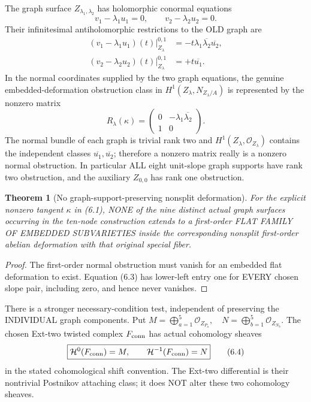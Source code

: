 \documentclass[11pt,a4paper]{article}
\newtheorem{theorem}{Theorem}[section]
\begin{document}
The graph surface
\(Z_{\lambda_1,\lambda_2}\)
has holomorphic conormal equations
\[
    v_1-\lambda_1u_1=0,\qquad
    v_2-\lambda_2u_2=0 .
\]
Their infinitesimal antiholomorphic
restrictions to the OLD graph are
\[
 \begin{aligned}
 (v_1-\lambda_1u_1)(t)|_{Z_\lambda}^{0,1}
     &=-t\lambda_1\overline{\lambda_2}
                    \overline{u_2},\\
 (v_2-\lambda_2u_2)(t)|_{Z_\lambda}^{0,1}
     &=+t\overline{u_1}.
 \end{aligned}                                            \tag{6.2}
\]
In the normal coordinates supplied by
the two graph equations, the genuine
embedded-deformation obstruction
class in
\(
 H^1(Z_\lambda,N_{Z_\lambda/A})
\)
is represented by the nonzero matrix
\[
 \boxed{
 R_\lambda(\kappa)=
 \begin{pmatrix}
       0&-\lambda_1\overline{\lambda_2}\\
       1&0
 \end{pmatrix}.
 }                                                       \tag{6.3}
\]
The normal bundle of each graph is
trivial rank two and
\(H^1(Z_\lambda,\mathcal O_{Z_\lambda})\)
contains the independent classes
\(\overline{u_1},\overline{u_2}\);
therefore a nonzero matrix really
is a nonzero normal obstruction.
In particular ALL eight unit-slope
graph supports have rank two
obstruction, and the auxiliary
\(Z_{0,0}\) has rank one obstruction.

\begin{theorem}[No graph-support-preserving nonsplit deformation]
For the explicit nonzero tangent
\(\kappa\) in (6.1), NONE of the nine
distinct actual graph surfaces
occurring in the ten-node
construction extends to a
first-order FLAT FAMILY OF
EMBEDDED SUBVARIETIES inside
the corresponding nonsplit
first-order abelian deformation
with that original special fiber.
\end{theorem}
\begin{proof}
The first-order normal obstruction
must vanish for an embedded
flat deformation to exist.
Equation (6.3) has lower-left
entry one for EVERY chosen
slope pair, including zero,
and hence never vanishes.
\end{proof}

There is a stronger necessary-condition
test, independent of preserving the
INDIVIDUAL graph components.
Put
\(
 M=\bigoplus_{a=1}^{5}\mathcal O_{Z_{P_a}},
\quad
 N=\bigoplus_{b=1}^{5}\mathcal O_{Z_{N_b}}.
\)
The chosen Ext-two twisted
complex \(F_{\rm conn}\) has
actual cohomology sheaves
\[
 \boxed{
       \mathcal H^{0}(F_{\rm conn})=M,\qquad
       \mathcal H^{-1}(F_{\rm conn})=N
 }                                                       \tag{6.4}
\]
in the stated cohomological shift
convention. The Ext-two
differential is their nontrivial
Postnikov attaching class; it
does NOT alter these two
cohomology sheaves.
\end{document}
